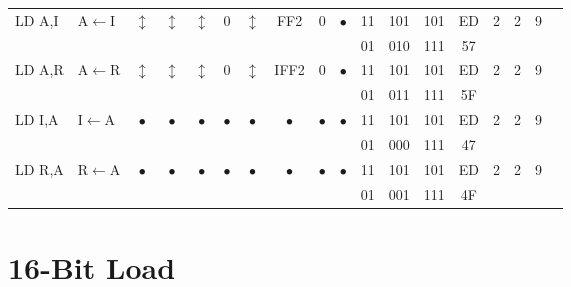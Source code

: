 \documentclass[oneside,a4paper]{book}
\newcommand{\instrt}{\rule{0pt}{2.7ex}}
\newcommand{\instrb}{\rule[-1.7ex]{0pt}{0pt}}
\begin{document}
{\begin{tabular}{llcccccccccccccccl}
		LD A,I\instrt & 
			A$\leftarrow$I & 
			$\updownarrow$ & 
				$\updownarrow$ &
				 $\updownarrow$ & 
				 0 & 
				 $\updownarrow$ & 
				 {\tiny FF2} & 
				 0 & 
				 $\bullet$ & 
			11 & 101 & 101 & 
			ED & 2 & 
			2 & 9 & \\ 
		\multicolumn{10}{c}{} & 01 & 010 & 111 & 57 & & & & \instrb \\

		LD A,R\instrt & 
			A$\leftarrow$R & 
			$\updownarrow$ & 
				$\updownarrow$ & 
				$\updownarrow$ & 
				0 & 
				$\updownarrow$ & 
				{\tiny IFF2} & 
				0 & 
				$\bullet$ & 
			11 & 101 & 101 & 
			ED & 2 & 
			2 & 9 & \\ 
		\multicolumn{10}{c}{} & 01 & 011 & 111 & 5F & & & & \instrb \\

		LD I,A\instrt & 
			I$\leftarrow$A & 
			$\bullet$ & 
				$\bullet$ & 
				$\bullet$ & 
				$\bullet$ & 
				$\bullet$ & 
				$\bullet$ & 
				$\bullet$ & 
				$\bullet$ & 
			11 & 101 & 101 & 
			ED & 2 & 
			2 & 9 & \\ 
		\multicolumn{10}{c}{} & 01 & 000 & 111 & 47 & & & & \instrb \\

		LD R,A\instrt & 
			R$\leftarrow$A & 
			$\bullet$ & 
				$\bullet$ & 
				$\bullet$ & 
				$\bullet$ & 
				$\bullet$ & 
				$\bullet$ & 
				$\bullet$ & 
				$\bullet$ & 
			11 & 101 & 101 & 
			ED & 2 & 
			2 & 9 & \\ 
		\multicolumn{10}{c}{} & 01 & 001 & 111 & 4F & & & & \instrb \\

	\hline

	\end{tabular}
}


\section{16-Bit Load}
\end{document}
